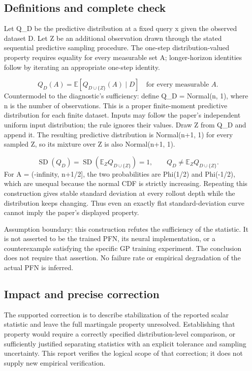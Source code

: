 \documentclass[10pt]{article}
\begin{document}
\subsection*{Definitions and complete check}
Let Q\_D be the predictive distribution at a fixed query x given the observed dataset D. Let Z be an additional observation drawn through the stated sequential predictive sampling procedure. The one-step distribution-valued property requires equality for every measurable set A; longer-horizon identities follow by iterating an appropriate one-step identity.\par
\[Q_D(A)=\mathbb E\!\left[Q_{D\cup\{Z\}}(A)\mid D\right]\quad\text{for every measurable }A.\] Countermodel to the diagnostic’s sufficiency: define Q\_D = Normal(n, 1), where n is the number of observations. This is a proper finite-moment predictive distribution for each finite dataset. Inputs may follow the paper’s independent uniform input distribution; the rule ignores their values. Draw Z from Q\_D and append it. The resulting predictive distribution is Normal(n+1, 1) for every sampled Z, so its mixture over Z is also Normal(n+1, 1).\par
\[\operatorname{SD}(Q_D)=\operatorname{SD}\!\left(\mathbb E_Z Q_{D\cup\{Z\}}\right)=1,\qquad Q_D\ne\mathbb E_Z Q_{D\cup\{Z\}}.\] For A = (-infinity, n+1/2], the two probabilities are Phi(1/2) and Phi(-1/2), which are unequal because the normal CDF is strictly increasing. Repeating this construction gives stable standard deviation at every rollout depth while the distribution keeps changing. Thus even an exactly flat standard-deviation curve cannot imply the paper’s displayed property.\par
Assumption boundary: this construction refutes the sufficiency of the statistic. It is not asserted to be the trained PFN, its neural implementation, or a counterexample satisfying the specific GP training experiment. The conclusion does not require that assertion. No failure rate or empirical degradation of the actual PFN is inferred.\par
\subsection*{Impact and precise correction}
The supported correction is to describe stabilization of the reported scalar statistic and leave the full martingale property unresolved. Establishing that property would require a correctly specified distribution-level comparison, or sufficiently justified separating statistics with an explicit tolerance and sampling uncertainty. This report verifies the logical scope of that correction; it does not supply new empirical verification.\par
\end{document}
